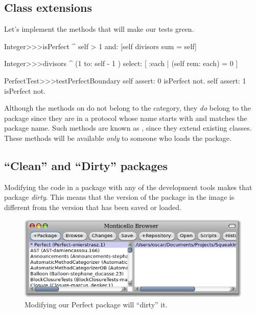 \documentclass[a4paper,10pt,twoside]{book}
\begin{document}
\subsection{Class extensions}

Let's implement the methods that will make our tests green.


\begin{code}{}
Integer>>>isPerfect
	^ self > 1 and: [self divisors sum = self]

Integer>>>divisors
	^ (1 to: self - 1 ) select: [ :each | (self rem: each) = 0 ]

PerfectTest>>>testPerfectBoundary
	self assert: 0 isPerfect not.
	self assert: 1 isPerfect not.
\end{code}

Although the methods on  do not belong to the  category, they \emph{do} belong to the  package since they are in a protocol whose name starts with \ct{*} and matches the package name. Such methods are known as , since they extend existing classes. These methods will be available \emph{only} to someone who loads the  package.


\subsection{``Clean'' and ``Dirty'' packages}

Modifying the code in a package with any of the development tools makes that package \emph{dirty}.
This means that the version of the package in the image is different from the version that has been saved or loaded. 

\begin{figure}[ht]\centering
	\includegraphics[width=\textwidth]{dirty}
	\caption{Modifying our Perfect package will ``dirty'' it.}
\end{figure}
\end{document}

